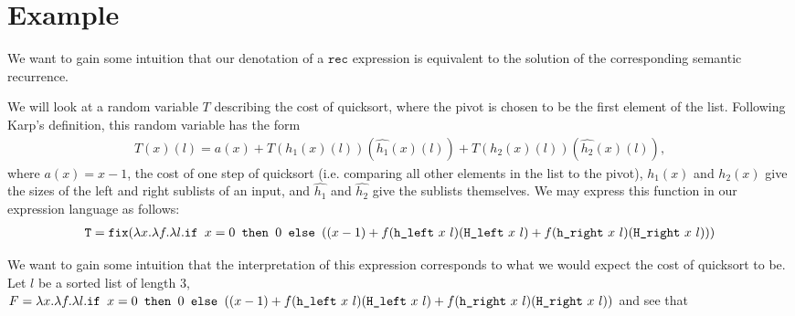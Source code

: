 \section{Example}
We want to gain some intuition that our denotation of a $\texttt{rec}$ expression is equivalent to the solution of
the corresponding semantic recurrence. 

We will look at a random variable $T$ describing the cost of quicksort, where the pivot is chosen to be the first element 
of the list. Following Karp's definition, this random variable has the form 
\begin{align*}
T(x)(l) = a(x) + T(h_1(x)(l))(\hat{h_1}(x)(l)) + T(h_2(x)(l))(\hat{h_2}(x)(l)), 
\end{align*}
where $a(x) = x-1$, the cost of one step of quicksort (i.e. comparing all other elements
in the list to the pivot), $h_1(x)$ and $h_2(x)$ give the sizes of the left and right sublists of an input, and
$\hat{h_1}$ and $\hat{h_2}$ give the sublists themselves. We may express this function in our expression language
as follows:
\begin{align*}
\texttt{T} = \texttt{fix}(\lambda x. \lambda f. \lambda l. \texttt{if } x=0 \texttt{ then } 0 \texttt{ else } ((x-1) 
		+ f(\texttt{h\_left} \ x \ l)(\texttt{H\_left} \ x \ l) + f(\texttt{h\_right} \ x \ l)(\texttt{H\_right} \ x \ l)))
\end{align*}
 
 We want to gain some intuition that the interpretation of this expression corresponds to what we would expect
 the cost of quicksort to be. Let $l$ be a sorted list of length $3$, $F = \lambda x. \lambda f. \lambda l. \texttt{if } x = 0 \texttt{ then } 0 \texttt{ else } ((x-1) + f(\texttt{h\_left} \ x \ l)(\texttt{H\_left} \ x \ l) + f(\texttt{h\_right} \ x \ l)(\texttt{H\_right} \ x \ l))$  and see that

